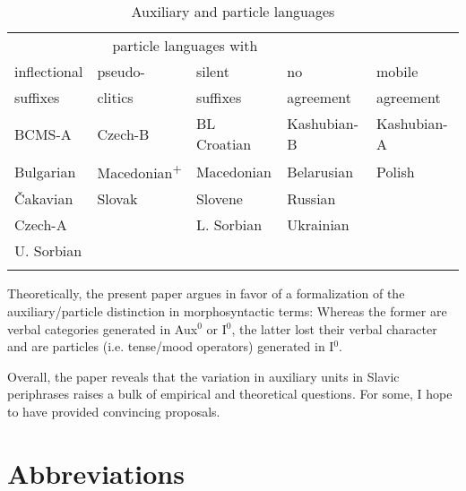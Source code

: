 \documentclass[output=paper]{langscibook}
\begin{document}
\begin{table}
\begin{tabular}{lllll}
\lsptoprule
\multicolumn{3}{c}{auxiliary languages with} & \multicolumn{2}{c}{particle languages with} \\\cmidrule(lr){1-3}\cmidrule(lr){4-5}
inflectional& pseudo-       & silent        & no            & mobile \\
suffixes    & clitics       &  suffixes     & agreement     & agreement \\
\midrule
BCMS-A      & Czech-B       & BL Croatian   & Kashubian-B   & Kashubian-A  \\
Bulgarian   & Macedonian\textsuperscript{+}   & Macedonian    & Belarusian    & Polish \\
Čakavian    & Slovak        & Slovene       & Russian       & \\
Czech-A     &               & L. Sorbian    & Ukrainian     & \\
U. Sorbian  &               &               &               & \\
\lspbottomrule
\end{tabular}
    \caption{Auxiliary and particle languages}
    \label{pitsch:tab:classification}
\end{table}

Theoretically, the present paper argues in favor of a formalization of the auxiliary/particle distinction in morphosyntactic terms: Whereas the former are verbal categories generated in Aux$^0$ or I$^0$, the latter lost their verbal character and are particles (i.e. tense/mood operators) generated in I$^0$.

Overall, the paper reveals that the variation in auxiliary units in Slavic peri\-phrases raises a bulk of empirical and theoretical questions. For some, I hope to have provided convincing proposals.


\section*{Abbreviations}
\end{document}
